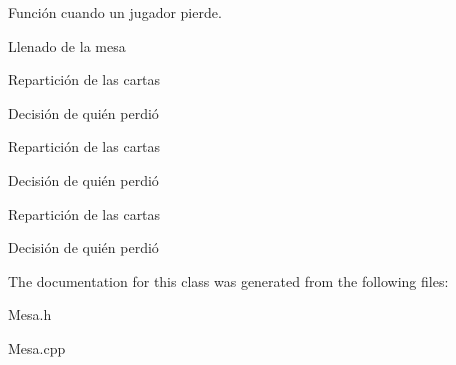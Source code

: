 Función cuando un jugador pierde. 

Llenado de la mesa

Repartición de las cartas

Decisión de quién perdió

Repartición de las cartas

Decisión de quién perdió

Repartición de las cartas

Decisión de quién perdió 

The documentation for this class was generated from the following files\+:\begin{DoxyCompactItemize}
\item 
Mesa.\+h\item 
Mesa.\+cpp\end{DoxyCompactItemize}

